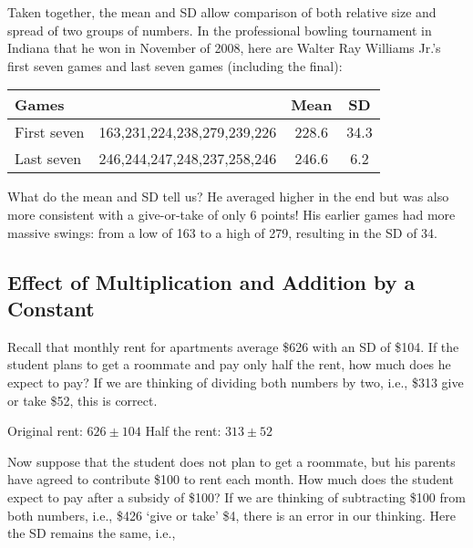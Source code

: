 \documentclass[11pt]{book}\usepackage[]{graphicx}\usepackage[]{color}
\begin{document}
Taken together, the mean and SD allow comparison of both relative size and spread of two groups of numbers.  In the professional bowling tournament in Indiana that he won in November of 2008, here are Walter Ray Williams Jr.'s first seven  games and last seven games (including the final):

\begin{table}[htbp]
   \centering
   \begin{tabular}{@{} | lccc | @{}} \hline
      Games &  & Mean & SD \\ \hline
      First seven & 163,231,224,238,279,239,226 & 228.6 & 34.3 \\
      Last seven  & 246,244,247,248,237,258,246 & 246.6 & 6.2 \\ \hline
   \end{tabular}
\end{table}

What do the mean and SD tell us?  He averaged higher in the end but was also more consistent with a give-or-take of only 6 points!  His earlier games had more massive swings: from a low of 163 to a high of 279, resulting in the SD of 34.

\subsection{Effect of Multiplication and Addition by a Constant}

Recall that monthly rent for apartments average \$626 with an SD of \$104.  If the student plans to get a roommate and pay only half the rent, how much does he expect to pay?  If we are thinking of dividing both numbers by two, i.e., \$313 give or take \$52, this is correct.

\begin{center}
Original rent: $ 626 \pm 104 $ \hspace{2cm}	Half the rent: $ 313 \pm 52 $
\end{center}

Now suppose that the student does not plan to get a roommate, but his parents have agreed to contribute \$100 to rent each month.  How much does the student expect to pay after a subsidy of \$100?  If we are thinking of subtracting \$100 from both numbers, i.e., \$426 `give or take' \$4, there is an error in our thinking.  Here the SD remains the same, i.e.,
\end{document}
